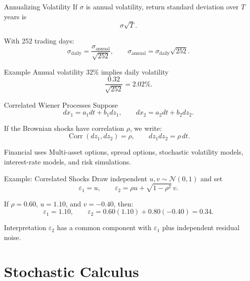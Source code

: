 \documentclass[aspectratio=169,11pt]{beamer}
\newcommand{\eps}{\varepsilon}
\newcommand{\Corr}{\operatorname{Corr}}
\newcommand{\Normal}{\mathcal{N}}
\begin{document}
\begin{frame}{Annualizing Volatility}
    If \(\sigma\) is annual volatility, return standard deviation over \(T\) years is
    \[
        \sigma\sqrt{T}.
    \]

    With 252 trading days:
    \[
        \sigma_{\text{daily}}
        =
        \frac{\sigma_{\text{annual}}}{\sqrt{252}},
        \qquad
        \sigma_{\text{annual}}
        =
        \sigma_{\text{daily}}\sqrt{252}.
    \]

    \begin{exampleblock}{Example}
        Annual volatility \(32\%\) implies daily volatility
        \[
            \frac{0.32}{\sqrt{252}}=2.02\%.
        \]
    \end{exampleblock}
\end{frame}

\begin{frame}[label=correlation_main]{Correlated Wiener Processes}
    Suppose
    \[
        dx_1=a_1dt+b_1dz_1,
        \qquad
        dx_2=a_2dt+b_2dz_2.
    \]

    If the Brownian shocks have correlation \(\rho\), we write:
    \[
        \Corr(dz_1,dz_2)=\rho,
        \qquad
        dz_1dz_2=\rho\,dt.
    \]

    \begin{block}{Financial uses}
        Multi-asset options, spread options, stochastic volatility models, interest-rate models, and risk simulations.
    \end{block}

    \hyperlink{deriv_correlated_normals}{}
\end{frame}

\begin{frame}{Example: Correlated Shocks}
    Draw independent \(u,v\sim\Normal(0,1)\) and set
    \[
        \eps_1=u,
        \qquad
        \eps_2=\rho u+\sqrt{1-\rho^2}\,v.
    \]

    If \(\rho=0.60\), \(u=1.10\), and \(v=-0.40\), then:
    \[
        \eps_1=1.10,
        \qquad
        \eps_2=0.60(1.10)+0.80(-0.40)=0.34.
    \]

    \begin{block}{Interpretation}
        \(\eps_2\) has a common component with \(\eps_1\) plus independent residual noise.
    \end{block}
\end{frame}

\section{Stochastic Calculus}
\end{document}
